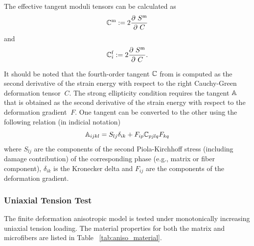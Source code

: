 \documentclass[12pt]{article}
\newcommand{\mtrx}{{\text{m}}}
\newcommand{\fiber}{{\text{f}}}
\numberwithin{equation}{section}
\begin{document}
The effective tangent moduli tensors can be calculated as
\begin{equation}\label{eq:aniso_tangent1}
  \bbC^\mtrx
  :=
  2 \frac{\partial ~S^\mtrx}{\partial~C}
\end{equation}
and
\begin{equation}\label{eq:aniso_tangent2}
  \bbC^\fiber_i
  :=
  2 \frac{\partial ~S^\mtrx}{\partial~C}.
\end{equation}

It should be noted that the fourth-order tangent $\mathbb{C}$ from
 is computed as the second derivative of the
strain energy with respect to the right Cauchy-Green deformation
tensor $~C$. The strong ellipticity condition
 requires the tangent $\mathbb{A}$ that is
obtained as the second derivative of the strain energy with respect to
the deformation gradient $~F$. One tangent can be converted to the
other using the following relation (in indicial notation)
\begin{equation}\label{eq:aniso_tangent3}
  \mathbb{A}_{ijkl} = S_{lj} \delta_{ik}
    + F_{ip} \mathbb{C}_{pjlq} F_{kq}
\end{equation}
where $S_{lj}$ are the components of the second Piola-Kirchhoff stress
(including damage contribution) of the corresponding phase (e.g.,
matrix or fiber component), $\delta_{ik}$ is the Kronecker delta and
$F_{ij}$ are the components of the deformation gradient.

\subsubsection{Uniaxial Tension Test}

The finite deformation anisotropic model is tested under monotonically
increasing uniaxial tension loading. The material properties for both
the matrix and microfibers are listed in Table~
\ref{tab:aniso_material}.
\end{document}
